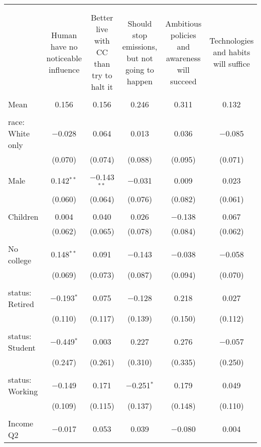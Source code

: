 
\begin{tabular}{@{\extracolsep{5pt}}lccccc} 
\\[-1.8ex]\hline 
\hline \\[-1.8ex] 
\\[-1.8ex] & Human have no noticeable influence & Better live with CC than try to halt it & Should stop emissions, but not going to happen & Ambitious policies and awareness will succeed & Technologies and habits will suffice \\ 
\hline \\[-1.8ex] 
 Mean & 0.156 & 0.156 & 0.246 & 0.311 & 0.132  \\ \hline \\[-1.8ex] race: White only & $-$0.028 & 0.064 & 0.013 & 0.036 & $-$0.085 \\ 
  & (0.070) & (0.074) & (0.088) & (0.095) & (0.071) \\ 
  & & & & & \\ 
 Male & 0.142$^{**}$ & $-$0.143$^{**}$ & $-$0.031 & 0.009 & 0.023 \\ 
  & (0.060) & (0.064) & (0.076) & (0.082) & (0.061) \\ 
  & & & & & \\ 
 Children & 0.004 & 0.040 & 0.026 & $-$0.138 & 0.067 \\ 
  & (0.062) & (0.065) & (0.078) & (0.084) & (0.062) \\ 
  & & & & & \\ 
 No college & 0.148$^{**}$ & 0.091 & $-$0.143 & $-$0.038 & $-$0.058 \\ 
  & (0.069) & (0.073) & (0.087) & (0.094) & (0.070) \\ 
  & & & & & \\ 
 status: Retired & $-$0.193$^{*}$ & 0.075 & $-$0.128 & 0.218 & 0.027 \\ 
  & (0.110) & (0.117) & (0.139) & (0.150) & (0.112) \\ 
  & & & & & \\ 
 status: Student & $-$0.449$^{*}$ & 0.003 & 0.227 & 0.276 & $-$0.057 \\ 
  & (0.247) & (0.261) & (0.310) & (0.335) & (0.250) \\ 
  & & & & & \\ 
 status: Working & $-$0.149 & 0.171 & $-$0.251$^{*}$ & 0.179 & 0.049 \\ 
  & (0.109) & (0.115) & (0.137) & (0.148) & (0.110) \\ 
  & & & & & \\ 
 Income Q2 & $-$0.017 & 0.053 & 0.039 & $-$0.080 & 0.004 \\ 

\end{tabular}
